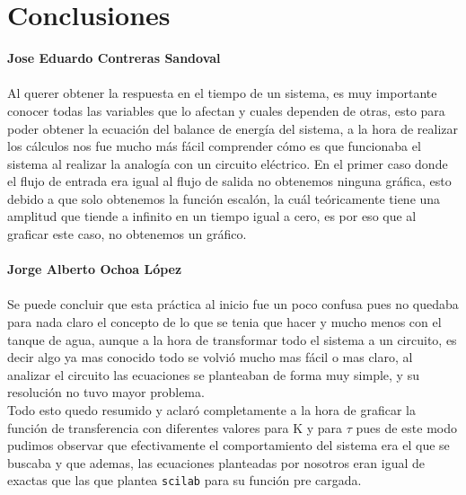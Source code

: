 \documentclass[letterpaper,10pt]{article}
\begin{document}
\section*{Conclusiones}
\textbf{Jose Eduardo Contreras Sandoval}\\\\
Al querer obtener la respuesta en el tiempo de un sistema, es muy importante conocer todas las variables que lo
afectan y cuales dependen de otras, esto para poder obtener la ecuación del balance de energía del sistema, a la 
hora de realizar los cálculos nos fue mucho más fácil comprender cómo es que funcionaba el sistema al realizar la
analogía con un circuito eléctrico. En el primer caso donde el flujo de entrada era igual al flujo de salida
no obtenemos ninguna gráfica, esto debido a que solo obtenemos la función escalón, la cuál teóricamente tiene una 
amplitud que tiende a infinito en un tiempo igual a cero, es por eso que al graficar este caso, no obtenemos un gráfico.\\ \\
\textbf{Jorge Alberto Ochoa López}\\\\
Se puede concluir que esta práctica al inicio fue un poco confusa pues no quedaba para nada claro el concepto de lo que se tenia que hacer y mucho menos con el tanque de agua, aunque a la hora de transformar todo el sistema a un circuito, es decir algo ya mas conocido todo se volvió mucho mas fácil o mas claro, al analizar el circuito las ecuaciones se planteaban de forma muy simple, y su resolución no tuvo mayor problema.\\
Todo esto quedo resumido y aclaró completamente a la hora de graficar la función de transferencia con diferentes valores para K y para $\tau$ pues de este modo pudimos observar que efectivamente el comportamiento del sistema era el que se buscaba y que ademas, las ecuaciones planteadas por nosotros eran igual de exactas que las que plantea \texttt{scilab} para su función pre cargada.
\end{document}
